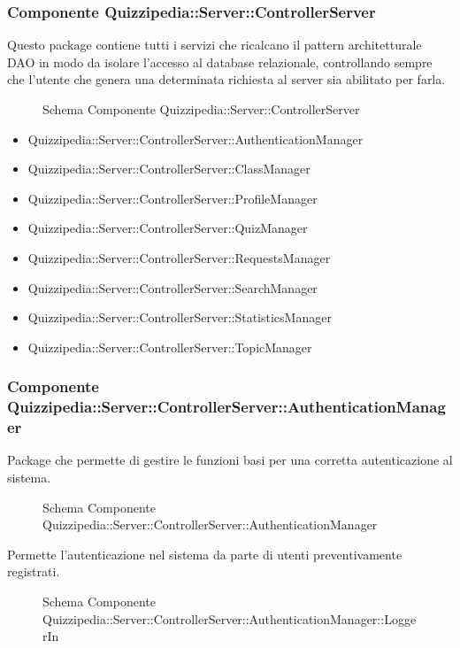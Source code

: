 \subsubsection{Componente Quizzipedia::Server::ControllerServer}
Questo package contiene tutti i servizi che ricalcano il pattern architetturale DAO in modo da isolare l'accesso al database relazionale, controllando sempre che l'utente che genera una determinata richiesta al server sia abilitato per farla.
\begin{figure}[H]
\centering
\noindent{}
\caption{Schema Componente Quizzipedia::Server::ControllerServer}
\end{figure}
\begin{itemize}
\item Quizzipedia::Server::ControllerServer::AuthenticationManager
\item Quizzipedia::Server::ControllerServer::ClassManager
\item Quizzipedia::Server::ControllerServer::ProfileManager
\item Quizzipedia::Server::ControllerServer::QuizManager
\item Quizzipedia::Server::ControllerServer::RequestsManager
\item Quizzipedia::Server::ControllerServer::SearchManager
\item Quizzipedia::Server::ControllerServer::StatisticsManager
\item Quizzipedia::Server::ControllerServer::TopicManager
\end{itemize}
\subsubsection{Componente Quizzipedia::Server::ControllerServer::AuthenticationManager}
Package che permette di gestire le funzioni basi per una corretta autenticazione al sistema.
\begin{figure}[H]
\centering
\noindent{}
\caption{Schema Componente Quizzipedia::Server::ControllerServer::AuthenticationManager}
\end{figure}
Permette l'autenticazione nel sistema da parte di utenti preventivamente registrati.
\begin{figure}[H]
\centering
\noindent{}
\caption{Schema Componente Quizzipedia::Server::ControllerServer::AuthenticationManager::LoggerIn}
\end{figure}

